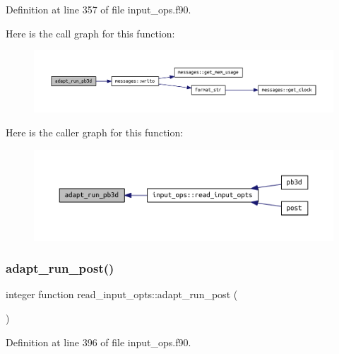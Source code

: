 Definition at line 357 of file input\+\_\+ops.\+f90.

Here is the call graph for this function\+:
\nopagebreak
\begin{figure}[H]
\begin{center}
\leavevmode
\includegraphics[width=350pt]{input__ops_8f90_a4f2af8cdda395ccda6a1adea6c1d578c_cgraph}
\end{center}
\end{figure}
Here is the caller graph for this function\+:
\nopagebreak
\begin{figure}[H]
\begin{center}
\leavevmode
\includegraphics[width=350pt]{input__ops_8f90_a4f2af8cdda395ccda6a1adea6c1d578c_icgraph}
\end{center}
\end{figure}
\mbox{\label{input__ops_8f90_a0ba5a762c885daaf5fcc2c60ab81c535}} 
\subsubsection{\texorpdfstring{adapt\+\_\+run\+\_\+post()}{adapt\_run\_post()}}
{\footnotesize\ttfamily integer function read\+\_\+input\+\_\+opts\+::adapt\+\_\+run\+\_\+post (\begin{DoxyParamCaption}{ }\end{DoxyParamCaption})}



Definition at line 396 of file input\+\_\+ops.\+f90.

